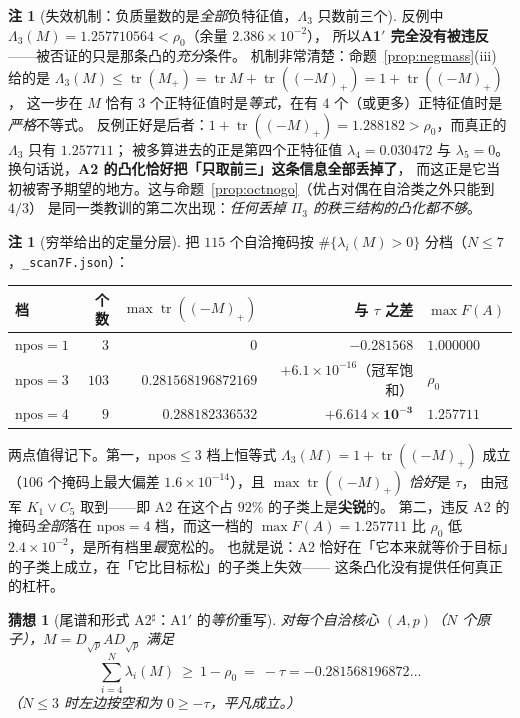 \documentclass[UTF8,11pt]{ctexart}
\newtheorem{conjecture}[theorem]{猜想}
\theoremstyle{definition}
\newtheorem{remark}[theorem]{注}
\newcommand{\Lam}{\Lambda}
\newcommand{\tr}{\operatorname{tr}}
\begin{document}
\begin{remark}[失效机制：负质量数的是\emph{全部}负特征值，$\Lam_3$ 只数前三个]\label{rmk:A2why}
反例中 $\Lam_3(M)=1.257710564<\rho_0$（余量 $2.386\times10^{-2}$），
所以\textbf{A1$'$ 完全没有被违反}——被否证的只是那条凸的\emph{充分}条件。
机制非常清楚：命题~\ref{prop:negmass}(iii) 给的是
$\Lam_3(M)\le\tr(M_+)=\tr M+\tr((-M)_+)=1+\tr((-M)_+)$，
这一步在 $M$ 恰有 $3$ 个正特征值时是\emph{等式}，在有 $4$ 个（或更多）正特征值时是\emph{严格}不等式。
反例正好是后者：$1+\tr((-M)_+)=1.288182>\rho_0$，而真正的 $\Lam_3$ 只有 $1.257711$；
被多算进去的正是第四个正特征值 $\lambda_4=0.030472$ 与 $\lambda_5=0$。
换句话说，\textbf{A2 的凸化恰好把「只取前三」这条信息全部丢掉了}，
而这正是它当初被寄予期望的地方。这与命题~\ref{prop:octnogo}（优占对偶在自洽类之外只能到 $4/3$）
是同一类教训的第二次出现：\emph{任何丢掉 $\Pi_3$ 的秩三结构的凸化都不够}。
\end{remark}

\begin{remark}[穷举给出的定量分层]\label{rmk:A2strata}
把 $115$ 个自洽掩码按 $\#\{\lambda_i(M)>0\}$ 分档（$N\le7$，\texttt{\_scan7F.json}）：
\begin{center}
{\small
\begin{tabular}{@{}lrrrl@{}}
\toprule
档 & 个数 & $\max\tr((-M)_+)$ & 与 $\tau$ 之差 & $\max F(A)$ \\
\midrule
$\mathrm{npos}=1$ & $3$ & $0$ & $-0.281568$ & $1.000000$ \\
$\mathrm{npos}=3$ & $103$ & $0.281568196872169$ & $+6.1\times10^{-16}$（冠军饱和） & $\rho_0$ \\
$\mathrm{npos}=4$ & $9$ & $0.288182336532$ & $\mathbf{+6.614\times10^{-3}}$ & $1.257711$ \\
\bottomrule
\end{tabular}}
\end{center}
两点值得记下。第一，$\mathrm{npos}\le3$ 档上恒等式 $\Lam_3(M)=1+\tr((-M)_+)$ 成立
（$106$ 个掩码上最大偏差 $1.6\times10^{-14}$），且 $\max\tr((-M)_+)$ \emph{恰好}是 $\tau$，
由冠军 $K_1\vee C_5$ 取到——即 A2 在这个占 $92\%$ 的子类上是\textbf{尖锐}的。
第二，违反 A2 的掩码\emph{全部}落在 $\mathrm{npos}=4$ 档，而这一档的 $\max F(A)=1.257711$
比 $\rho_0$ 低 $2.4\times10^{-2}$，是所有档里\emph{最}宽松的。
也就是说：A2 恰好在「它本来就等价于目标」的子类上成立，在「它比目标松」的子类上失效——
这条凸化没有提供任何真正的杠杆。
\end{remark}

\begin{conjecture}[尾谱和形式 A2$^\sharp$：A1$'$ 的\emph{等价}重写]\label{conj:A2sharp}
对每个自洽核心 $(A,p)$（$N$ 个原子），$M=D_{\sqrt p}AD_{\sqrt p}$ 满足
\[
\sum_{i=4}^{N}\lambda_i(M)\ \ge\ 1-\rho_0\ =\ -\tau =-0.281568196872\ldots
\]
（$N\le3$ 时左边按空和为 $0\ge-\tau$，平凡成立。）
\end{conjecture}
\end{document}
